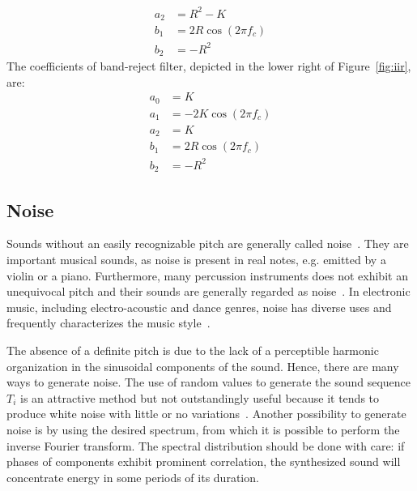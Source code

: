 \begin{enumerate}
\begin{equation}
\begin{split}
 a_2 & =  R^2-K \\
 b_1 & =  2R \cos (2\pi f_c) \\
 b_2 & =  -R^2
 \end{split}
\end{equation}
The coefficients of band-reject filter, depicted in the lower right of Figure~\ref{fig:iir}, are:
\begin{equation}\label{eq:rejeita-banda}
 \begin{split}
 a_0 & =  K \\
 a_1 & =  -2K\cos (2\pi f_c) \\
 a_2 & =  K \\
 b_1 & =  2R \cos (2\pi f_c) \\
 b_2 & =  -R^2
\end{split}
\end{equation}
\end{enumerate}

\subsection{Noise}\label{subsec:ruidos}
Sounds without an easily recognizable pitch are generally called noise~\cite{Lacerda}. They are important musical sounds, as noise is present in real notes, e.g. emitted by a violin or a piano. Furthermore, many percussion instruments does not exhibit an unequivocal pitch and their sounds are generally regarded as noise~\cite{Roederer}. In electronic music, including electro-acoustic and dance genres, noise has diverse uses and frequently characterizes the music style~\cite{Cook}. 

The absence of a definite pitch is due to the lack of a perceptible harmonic organization in the sinusoidal components of the sound.
Hence, there are many ways to generate noise. The use of random values to generate the sound sequence $T_i$ is an attractive method but not outstandingly useful because it tends to produce white noise with little or no variations~\cite{Cook}. Another possibility to generate noise is by using the desired spectrum, from which it is possible to perform the inverse Fourier transform. The spectral distribution should be done with care: if phases of components exhibit prominent correlation, the synthesized sound will concentrate energy in some periods of its duration.

